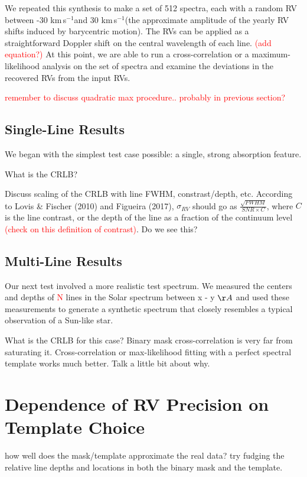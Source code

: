 \documentclass[modern]{aastex61}
\newcommand{\kms}{km\,s$^{-1}$}
\newcommand\todo[1]{\textcolor{red}{#1}}  %
\begin{document}
We repeated this synthesis to make a set of 512 spectra, each with a random RV between -30 \kms and 30 \kms (the approximate amplitude of the yearly RV shifts induced by barycentric motion). The RVs can be applied as a straightforward Doppler shift on the central wavelength of each line. \todo{(add equation?)} At this point, we are able to run a cross-correlation or a maximum-likelihood analysis on the set of spectra and examine the deviations in the recovered RVs from the input RVs.

\todo{remember to discuss quadratic max procedure.. probably in previous section?}

\subsection{Single-Line Results}

We began with the simplest test case possible: a single, strong absorption feature.

What is the CRLB?

Discuss scaling of the CRLB with line FWHM, constrast/depth, etc. According to Lovis \& Fischer (2010) and Figueira (2017), $\sigma_{RV}$ should go as $\frac{\sqrt{FWHM}}{SNR \times C}$, where $C$ is the line contrast, or the depth of the line as a fraction of the continuum level \todo{(check on this definition of contrast)}. Do we see this?

\subsection{Multi-Line Results}

Our next test involved a more realistic test spectrum. We measured the centers and depths of \todo{N} lines in the Solar spectrum between {x - y} $\AA$ and used these measurements to generate a synthetic spectrum that closely resembles a typical observation of a Sun-like star.

What is the CRLB for this case? Binary mask cross-correlation is very far from saturating it. Cross-correlation or max-likelihood fitting with a perfect spectral template works much better. Talk a little bit about why.

\section{Dependence of RV Precision on Template Choice}

how well does the mask/template approximate the real data? try fudging the relative line depths and locations in both the binary mask and the template.
\end{document}
